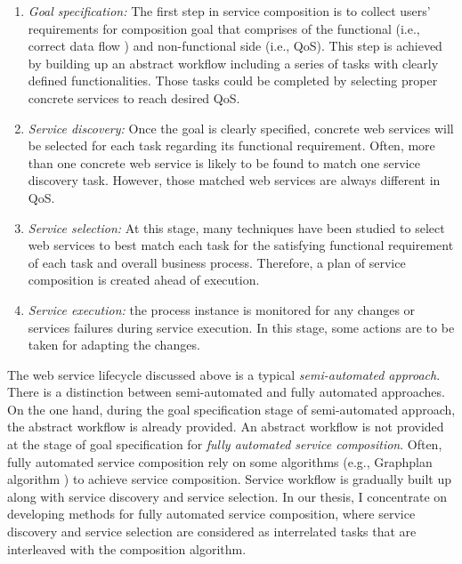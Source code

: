 \begin{enumerate}
 \item \textit{Goal specification:} The first step in service composition is to collect users' requirements for composition goal that comprises of the functional (i.e., correct data flow ) and non-functional side (i.e., QoS). This step is achieved by building up an abstract workflow including a series of tasks with clearly defined functionalities. Those tasks could be completed by selecting proper concrete services to reach desired QoS. 
 \item \textit{Service discovery:} Once the goal is clearly specified, concrete web services will be selected for each task regarding its functional requirement. Often, more than one concrete web service is likely to be found to match one service discovery task. However, those matched web services are always different in QoS.
 \item \textit{Service selection:} At this stage, many techniques have been studied to select web services to best match each task for the satisfying functional requirement of each task and overall business process. Therefore, a plan of service composition is created ahead of execution.
 \item \textit{Service execution:} the process instance is monitored for any changes or services failures during service execution. In this stage, some actions are to be taken for adapting the changes.
\end{enumerate}
The web service lifecycle discussed above is a typical \emph{semi-automated approach}. There is a distinction between semi-automated and fully automated approaches. On the one hand, during the goal specification stage of semi-automated approach, the abstract workflow is already provided. An abstract workflow is not provided at the stage of goal specification for \emph{fully automated service composition}. Often, fully automated service composition rely on some algorithms (e.g., Graphplan algorithm \cite{blum1997fast}) to achieve service composition. Service workflow is gradually built up along with service discovery and service selection. In our thesis, I concentrate on developing methods for fully automated service composition, where service discovery and service selection are considered as interrelated tasks that are interleaved with the composition algorithm. 


